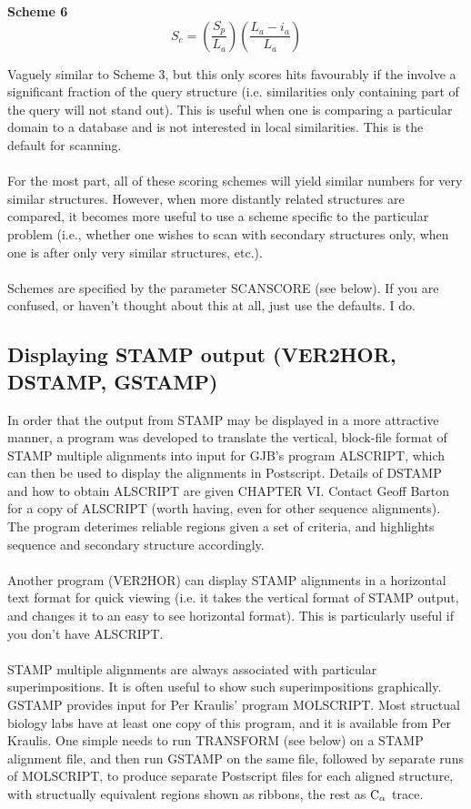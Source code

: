 {\bf Scheme 6}
\[
S_{c} =
\left(
\frac{S_{p}}{L_{a}}
\right)
\left(
\frac{L_{a}-i_{a}}{L_{a}}
\right)
\]

Vaguely similar to Scheme 3, but this only scores hits favourably
if the involve a significant fraction of the query structure
(i.e. similarities only containing part of the query will not
stand out).  This is useful when one is comparing a particular
domain to a database and is not interested in local similarities.
This is the default for scanning.\\
\\
For the most part, all of these scoring schemes will yield similar
numbers for very similar structures.  However, when more distantly
related structures are compared, it becomes more useful to use a
scheme specific to the particular problem (i.e., whether one wishes
to scan with secondary structures only, when one is after only
very similar structures, etc.).\\
\\
Schemes are specified by the parameter SCANSCORE (see below).  If 
you are confused, or haven't thought about this at all, just use the 
defaults.  I do.

\subsection{Displaying STAMP output (VER2HOR, DSTAMP, GSTAMP)}

In order that the output from STAMP may be displayed in a more 
attractive manner, a program was developed to translate the
vertical, block-file format of STAMP multiple alignments into input
for GJB's program ALSCRIPT, which can then be used to display the
alignments in Postscript.  Details of DSTAMP and how to obtain
ALSCRIPT are given CHAPTER VI.  Contact Geoff Barton for a copy of
ALSCRIPT (worth having, even for other sequence alignments).
The program deterimes reliable regions given a set of criteria, and
highlights sequence and secondary structure accordingly.\\
\\
Another program (VER2HOR) can display STAMP alignments in a horizontal text
format for quick viewing (i.e. it takes the vertical format of STAMP output, and
changes it to an easy to see horizontal format).
This is particularly useful if you don't have ALSCRIPT.\\
\\
STAMP multiple alignments are always associated with particular
superimpositions.  It is often useful to show such superimpositions
graphically.  GSTAMP provides input for Per
Kraulis' program MOLSCRIPT.  Most structual biology labs have at
least one copy of this program, and it is available from Per
Kraulis.  One simple needs to run TRANSFORM (see below) on a STAMP
alignment file, and then run GSTAMP on the same file, followed by
separate runs of MOLSCRIPT, to produce separate Postscript files
for each aligned structure, with structually equivalent regions
shown as ribbons, the rest as ${\rm C}_{\alpha}$ trace.


